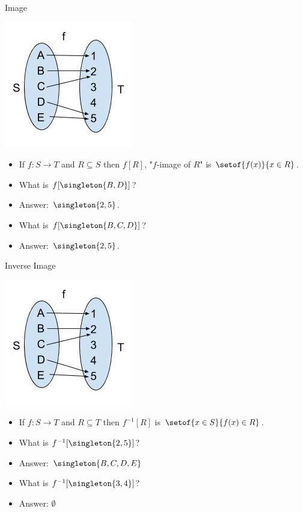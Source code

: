 \documentclass{beamer}
\begin{document}
\begin{frame}{Image}
\begin{center}
\includegraphics[scale=0.25]{function1}
\end{center}

\begin{itemize}
\item If $f:S\to T$ and $R\subseteq S$ then $f[R]$, "$f$-image of $R$" is
$\setof{f(x)}{x\in R}$.
\item What is $f[\singleton{B,D}]$?
\item Answer: $\singleton{2, 5}$.
\item What is $f[\singleton{B,C,D}]$?
\item Answer: $\singleton{2,5}$.
\end{itemize}
\end{frame}



\begin{frame}{Inverse Image}
\begin{center}
\includegraphics[scale=0.25]{function1}
\end{center}

\begin{itemize}
\item If $f:S\to T$ and $R\subseteq T$ then $f^{-1}[R]$ is
$\setof{x\in S}{f(x)\in R}$.
\item What is $f^{-1}[\singleton{2,5}]$?
\item Answer: $\singleton{B, C, D, E}$
\item What is $f^{-1}[\singleton{3,4}]$?
\item Answer: $\emptyset$
\end{itemize}
\end{frame}
\end{document}
